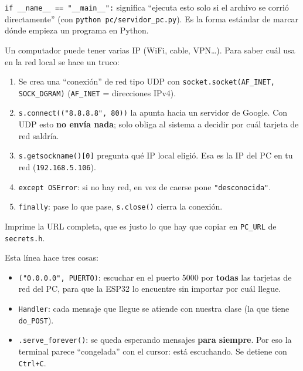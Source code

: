 \documentclass[11pt,a4paper]{article}
\begin{document}
\begin{description}[leftmargin=*,style=nextline]
  \item[Línea 43 --- punto de arranque]
        \texttt{if \_\_name\_\_ == "\_\_main\_\_":} significa ``ejecuta esto solo si
        el archivo se corrió directamente'' (con \texttt{python pc/servidor\_pc.py}).
        Es la forma estándar de marcar dónde empieza un programa en Python.
  \item[Líneas 44--51 --- averiguar la IP del PC]
        Un computador puede tener varias IP (WiFi, cable, VPN\ldots). Para saber
        cuál usa en la red local se hace un truco:
        \begin{enumerate}
          \item Se crea una ``conexión'' de red tipo UDP con
                \texttt{socket.socket(AF\_INET, SOCK\_DGRAM)} (\texttt{AF\_INET} = direcciones IPv4).
          \item \texttt{s.connect(("8.8.8.8", 80))} la apunta hacia un servidor de
                Google. Con UDP esto \textbf{no envía nada}; solo obliga al sistema a
                decidir por cuál tarjeta de red saldría.
          \item \texttt{s.getsockname()[0]} pregunta qué IP local eligió. Esa es la
                IP del PC en tu red (\texttt{192.168.5.106}).
          \item \texttt{except OSError}: si no hay red, en vez de caerse pone
                \texttt{"desconocida"}.
          \item \texttt{finally}: pase lo que pase, \texttt{s.close()} cierra la
                conexión.
        \end{enumerate}
  \item[Líneas 52--53 --- mostrar la dirección]
        Imprime la URL completa, que es justo lo que hay que copiar en
        \texttt{PC\_URL} de \texttt{secrets.h}.
  \item[Línea 54 --- arrancar y quedarse escuchando]
        Esta línea hace tres cosas:
        \begin{itemize}
          \item \texttt{("0.0.0.0", PUERTO)}: escuchar en el puerto 5000 por
                \textbf{todas} las tarjetas de red del PC, para que la ESP32 lo
                encuentre sin importar por cuál llegue.
          \item \texttt{Handler}: cada mensaje que llegue se atiende con nuestra
                clase (la que tiene \texttt{do\_POST}).
          \item \texttt{.serve\_forever()}: se queda esperando mensajes
                \textbf{para siempre}. Por eso la terminal parece ``congelada'' con
                el cursor: está escuchando. Se detiene con \texttt{Ctrl+C}.
        \end{itemize}
\end{description}
\end{document}
